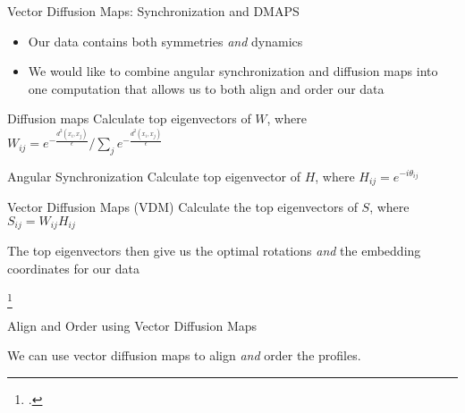 \begin{frame}{Vector Diffusion Maps: Synchronization and DMAPS}
	\begin{itemize}
		\item Our data contains both symmetries {\em and} dynamics
		\item We would like to combine angular synchronization and diffusion maps into one computation that allows us to both align and order our data
	\end{itemize}
	
	\begin{block}{Diffusion maps}
		Calculate top eigenvectors of $W$, where $W_{ij} = e^{-\frac{d^2(x_i, x_j)}{\epsilon}} / \sum_j e^{-\frac{d^2(x_i, x_j)}{\epsilon}} $
	\end{block}

	\begin{block}{Angular Synchronization}
		Calculate top eigenvector of $H$, where $H_{ij} = e^{-i \theta_{ij}}$
	\end{block}
	
	\begin{block}{Vector Diffusion Maps (VDM) \footnotemark} 
		Calculate the top eigenvectors of $S$, where $S_{ij} = W_{ij}H_{ij}$
		
		The top eigenvectors then give us the optimal rotations {\em and} the embedding coordinates for our data
	\end{block}
	\footcitetext{singer2012vector}
\end{frame}

\begin{frame}{Align and Order using Vector Diffusion Maps}

	\centering
	We can use vector diffusion maps to align {\em and} order the profiles.

	

\end{frame}